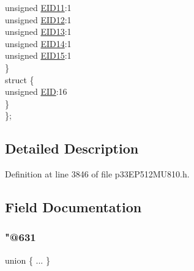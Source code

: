 \begin{DoxyCompactItemize}
\begin{tabbing}
\>\>unsigned \hyperlink{structtag_c1_r_x_f2_e_i_d_b_i_t_s_a710bdb0d602deb021b0be99066008018}{EID11}:1\\
\>\>unsigned \hyperlink{structtag_c1_r_x_f2_e_i_d_b_i_t_s_aa347bb85867bd8d4e0124f7cff8c6472}{EID12}:1\\
\>\>unsigned \hyperlink{structtag_c1_r_x_f2_e_i_d_b_i_t_s_a37d5f3edcbf6ef62f848fd4f3c584f79}{EID13}:1\\
\>\>unsigned \hyperlink{structtag_c1_r_x_f2_e_i_d_b_i_t_s_a7ffc0b0e0d99b8476b6f9a45337c17ab}{EID14}:1\\
\>\>unsigned \hyperlink{structtag_c1_r_x_f2_e_i_d_b_i_t_s_a293cd7dc1746257fa75a60cbd9383cd7}{EID15}:1\\
\>\} \\
\>struct \{\\
\>\>unsigned \hyperlink{structtag_c1_r_x_f2_e_i_d_b_i_t_s_ae80b378c9141f7c03e0b4e55b5f4b54d}{EID}:16\\
\>\} \\
\}; \\

\end{tabbing}\end{DoxyCompactItemize}


\subsection{Detailed Description}


Definition at line 3846 of file p33\+E\+P512\+M\+U810.\+h.



\subsection{Field Documentation}
\mbox{\label{structtag_c1_r_x_f2_e_i_d_b_i_t_s_a58cdf2a2385af0e104b241d417eede10}} 
\subsubsection{\texorpdfstring{"@631}{@631}}
{\footnotesize\ttfamily union \{ ... \} }

\mbox{\label{structtag_c1_r_x_f2_e_i_d_b_i_t_s_ae80b378c9141f7c03e0b4e55b5f4b54d}} 
